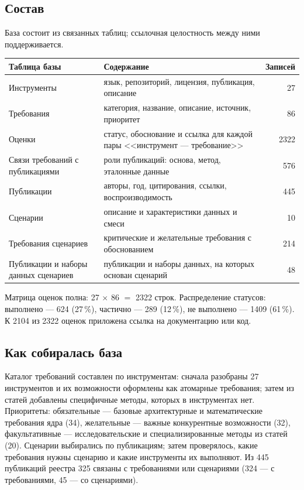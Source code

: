 \documentclass[10pt,a4paper]{article}
\begin{document}
\subsection{Состав}
База состоит из связанных таблиц; ссылочная целостность между ними поддерживается.
\begin{center}\small
\begin{tabular}{@{}l p{9.2cm} r@{}}
\toprule
Таблица базы & Содержание & Записей \\
\midrule
Инструменты & язык, репозиторий, лицензия, публикация, описание & 27 \\
Требования & категория, название, описание, источник, приоритет & 86 \\
Оценки & статус, обоснование и ссылка для каждой пары <<инструмент --- требование>> & 2322 \\
Связи требований с публикациями & роли публикаций: основа, метод, эталонные данные & 576 \\
Публикации & авторы, год, цитирования, ссылки, воспроизводимость & 445 \\
Сценарии & описание и характеристики данных и смеси & 10 \\
Требования сценариев & критические и желательные требования с обоснованием & 214 \\
Публикации и наборы данных сценариев & публикации и наборы данных, на которых основан сценарий & 48 \\
\bottomrule
\end{tabular}
\end{center}
Матрица оценок полна: 27 $\times$ 86 $=$ 2322 строк. Распределение статусов: выполнено --- 624 (27\,\%),
частично --- 289 (12\,\%), не выполнено --- 1409 (61\,\%).
К 2104 из 2322 оценок приложена ссылка на документацию или код.

\subsection{Как собиралась база}
Каталог требований составлен по инструментам: сначала разобраны 27 инструментов и их возможности оформлены как атомарные требования; затем из статей
добавлены специфичные методы, которых в инструментах нет. Приоритеты: обязательные --- базовые архитектурные и математические требования ядра (34),
желательные --- важные конкурентные возможности (32), факультативные --- исследовательские и специализированные методы из статей (20).
Сценарии выбирались по публикациям; затем проверялось, какие требования нужны сценарию и какие инструменты их выполняют.
Из 445 публикаций реестра 325 связаны с требованиями или сценариями (324 --- с требованиями, 45 --- со сценариями).
\end{document}
